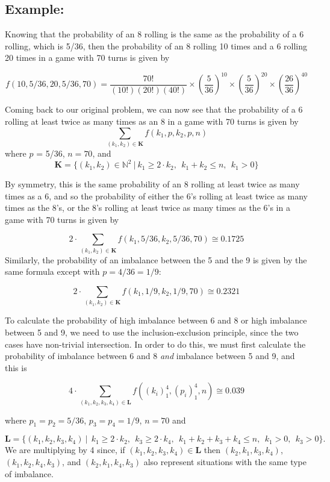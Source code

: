 \documentclass[11pt]{article}
\begin{document}
\subsection{Example:}
Knowing that the probability of an 8 rolling is the same as the probability of a 6 rolling, which is 5/36, then the probability of an 8 rolling 10 times and a 6 rolling 20 times in a game with 70 turns is given by

$$
f(10, 5/36, 20, 5/36, 70) =  \frac{70!}{(10!) (20!) (40!)} \times \left(\frac{5}{36}\right)^{10} \times \left(\frac{5}{36}\right)^{20} \times \left(\frac{26}{36}\right)^{40}
$$

Coming back to our original problem, we can now see that the probability of a 6 rolling at least twice as many times as an 8 in a game with 70 turns is given by
$$
\sum_{(k_1, k_2) \in \mathbf{K}} f(k_1, p, k_2, p, n)
$$
where $p$ = 5/36, $n=70$, and 
$$
\mathbf{K} = \{ (k_1, k_2) \in \mathbb{N}^ 2 \ | \ k_1 \geq 2\cdot k_2,\ \ k_1 + k_2 \leq n, \ \ k_1 > 0 \}
$$
 
By symmetry, this is the same probability of an 8 rolling at least twice as many times as a 6, and so the probability of either the 6's rolling at least twice as many times as the 8's, or the 8's rolling at least twice as many times as the 6's in a game with 70 turns is given by

$$
2 \cdot \sum_{(k_1, k_2) \in \mathbf{K}} f(k_1, 5/36, k_2, 5/36, 70) \cong 0.1725
$$
Similarly, the probability of an imbalance between the  5 and the 9 is given by the same formula except with $p=4/36 = 1/9$:

$$
2 \cdot \sum_{(k_1, k_2) \in \mathbf{K}} f(k_1, 1/9, k_2, 1/9, 70) \cong 0.2321
$$

To calculate the probability of high imbalance between 6 and 8 or high imbalance between 5 and 9, we need to use the  inclusion-exclusion principle, since the two cases have non-trivial intersection. In order to do this, we must first calculate the probability of imbalance between 6 and 8 \emph{and} imbalance between 5 and 9, and this is  

$$
4 \cdot \sum_{(k_1, k_2, k_3, k_4) \in \mathbf{L}} f((k_i)_1^4, (p_i)_1^4, n) \cong 0.039
$$

where $p_1 = p_2 = 5/36$, $p_3 = p_4 = 1/9$, $n=70$ and

$$
\mathbf{L} = \{ (k_1, k_2, k_3, k_4) \ | \ \ k_1 \geq 2\cdot k_2,\ \ k_3 \geq 2\cdot k_4,\ \ k_1 + k_2 + k_3 + k_4 \leq n, \ \ k_1 > 0, \ \ k_3 > 0 \}. 
$$
We are multiplying by 4 since, if $(k_1, k_2, k_3, k_4) \in \mathbf{L}$ then $(k_2, k_1, k_3, k_4)$, $(k_1, k_2, k_4, k_3)$, and  $(k_2, k_1, k_4, k_3)$ also represent situations with the same type of imbalance.
\end{document}
